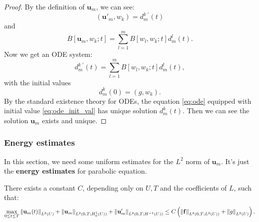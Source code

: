 \begin{proof}
    By the definition of $\mathbf{u}_{m}$, we can see:
    \begin{equation}
        \label{eq:ode_left}
        (\mathbf{u}'_{m},w_{k})=d_{m}^{k\;'}(t)
    \end{equation}
    and 
    \begin{equation}
        \label{eq:ode_right}
        B[\mathbf{u}_{m},w_{k};t]=\sum_{l=1}^{m}B[w_{l},w_{k};t]d_{m}^{l}(t).
    \end{equation}
    Now we get an ODE system:
    \begin{equation}
        \label{eq:ode}
        d_{m}^{k\;'}(t)=\sum_{l=1}^{m}B[w_{l},w_{k};t]d_{m}^{l}(t),
    \end{equation}
    with the initial values
    \begin{equation}
        \label{eq:ode_init_val}
        d_{m}^{k}(0)=(g,w_{k}).
    \end{equation}
    By the standard existence theory for ODEs, the equation \eqref{eq:ode} equipped with initial value \eqref{eq:ode_init_val} has unique solution $d_{m}^{k}(t)$. Then we can see the solution $\mathbf{u}_{m}$ exists and unique.
\end{proof}
\subsubsection{Energy estimates}
In this section, we need some uniform estimates for the $L^{2}$ norm of $\mathbf{u}_{m}$. It's just the \textbf{energy estimates} for parabolic equation.
\begin{theorem}
    There exists a constant $C$, depending only on $U,T$ and the coefficients of $L$, such that:
    \begin{equation}
        \label{eq:energy_estimate}
        \max_{0\le t\le T}\left\|\mathbf{u}_{m}(t)\right\|_{L^{2}(U)}+\left\|\mathbf{u}_{m}\right\|_{L^{2}(0,T;H_{0}^{1}(U))}+\left\|\mathbf{u}'_{m}\right\|_{L^{2}(0,T;H^{-1}(U))}\le C\left(\left\|\mathbf{f}\right\|_{L^{2}(0,T;L^{2}(U))}+\left\|g\right\|_{L^{2}(U)}\right).
    \end{equation}
\end{theorem}